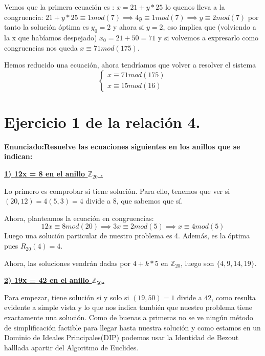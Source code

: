 \documentclass[11pt, a4paper, titlepage]{article}
\providecommand{\ent}{\mathbb{Z}}
\theoremstyle{theorem-style}
\theoremstyle{definition-style}
\theoremstyle{remark-style}
\theoremstyle{example-style}
\begin{document}
Vemos que la primera ecuación es : $x = 21+y*25$ lo quenos lleva a la congruencia: $21 +y*25 \equiv 1 mod(7) \implies 4y \equiv 1 mod(7) \implies y \equiv 2 mod(7)$ por tanto la solución óptima es $y_0 = 2$ y ahora si $y=2$, eso implica que (volviendo a la x que habíamos despejado) $x_0 = 21+50 = 71$ y si volvemos a expresarlo como congruencias nos queda $x \equiv 71 mod(175)$. 

Hemos reducido una ecuación, ahora tendríamos que volver a resolver el sistema
\[
\begin{cases}
	x \equiv 71 mod(175)\\
	x \equiv 15 mod(16)
\end{cases}
\]



\section{ Ejercicio 1 de la relación 4.}

\textbf{Enunciado:Resuelve las ecuaciones siguientes en los anillos que se indican:}

\underline{\textbf{1) 12x = 8 en el anillo $\ent_{20}$ .}}

Lo primero es comprobar si tiene solución. Para ello, tenemos que ver si $(20,12) = 4(5,3) = 4$ divide a 8, que sabemos que sí.

Ahora, planteamos la ecuación en congruencias:
	\[
	12x \equiv 8 mod(20) \implies 3x \equiv 2 mod(5) \implies x \equiv 4 mod(5)
	\]
Luego una solución particular de nuestro problema es 4. Además, es la óptima pues $R_{20}(4) = 4$.

Ahora, las soluciones vendrán dadas por $4+k*5$ en $\ent_{20}$, luego son $\{4,9,14,19\}$.

\underline{\textbf{2) 19x = 42 en el anillo $\ent_{50}$.}}

Para empezar, tiene solución si y solo si $(19,50)=1$ divide a $42$, como resulta evidente a simple vista y lo que nos indica también que nuestro problema tiene exactamente una solución. Como de buenas a primeras no se ve ningún método de simplificación factible para llegar hasta nuestra solución y como estamos en un Dominio de Ideales Principales(DIP) podemos usar la Identidad de Bezout halllada apartir del Algoritmo de Euclides.
\end{document}
